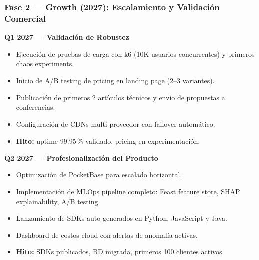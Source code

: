 ﻿\documentclass[11pt, letterpaper]{article}
\begin{document}
\subsubsection{Fase 2 --- Growth (2027): Escalamiento y Validación Comercial}



\textbf{Q1 2027 --- Validación de Robustez}

\begin{itemize}[leftmargin=1.5cm, label=\textbullet, itemsep=2pt, topsep=4pt]

    \item Ejecución de pruebas de carga con k6 (10K usuarios concurrentes) y primeros chaos experiments.

    \item Inicio de A/B testing de pricing en landing page (2--3 variantes).

    \item Publicación de primeros 2 artículos técnicos y envío de propuestas a conferencias.

    \item Configuración de CDNs multi-proveedor con failover automático.

    \item \textbf{Hito:} uptime 99.95\,\% validado, pricing en experimentación.

\end{itemize}



\textbf{Q2 2027 --- Profesionalización del Producto}

\begin{itemize}[leftmargin=1.5cm, label=\textbullet, itemsep=2pt, topsep=4pt]

    \item Optimización de PocketBase para escalado horizontal.

    \item Implementación de MLOps pipeline completo: Feast feature store, SHAP explainability, A/B testing.

    \item Lanzamiento de SDKs auto-generados en Python, JavaScript y Java.

    \item Dashboard de costos cloud con alertas de anomalía activas.

    \item \textbf{Hito:} SDKs publicados, BD migrada, primeros 100 clientes activos.

\end{itemize}
\end{document}
